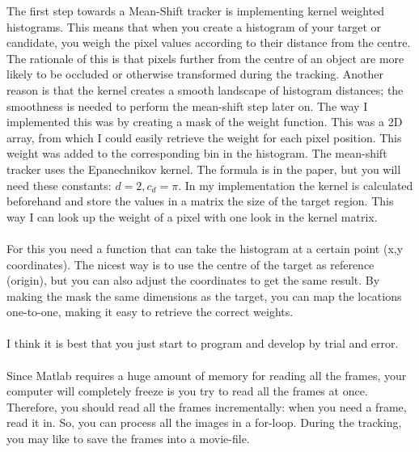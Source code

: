\documentclass[a4paper,11pt]{article}
\begin{document}
		The first step towards a Mean-Shift tracker is implementing kernel
		weighted histograms. This means that when you create a histogram of
		your target or candidate, you weigh the pixel values according to
		their distance from the centre. The rationale of this is that
		pixels further from the centre of an object are more likely to
		be occluded or otherwise transformed during the tracking. Another
		reason is that the kernel creates a smooth landscape of histogram
		distances; the smoothness is needed to perform the mean-shift step
		later on. The way I implemented this was by creating a mask of the
		weight function. This was a 2D array, from which I could easily
		retrieve the weight for each pixel position. This weight was added
		to the corresponding bin in the histogram. The mean-shift tracker
		uses the Epanechnikov kernel. The formula is in the paper, but you
		will need these constants: $d = 2, c_d = \pi$. In my implementation
		the kernel is calculated beforehand and store the values in a matrix
		the size of the target region. This way I can look up the weight of
		a pixel with one look in the kernel matrix.
		\\ \\
		For this you need a function that can take the histogram at a certain
		point (x,y coordinates). The nicest way is to use the centre of the
		target as reference (origin), but you can also adjust the coordinates
		to get the same result. By making the mask the same dimensions as the
		target, you can map the locations one-to-one, making it easy to retrieve
		the correct weights.
		\\ \\
		I think it is best that you just start to program and develop by trial
		and error.
		\\ \\
		Since Matlab requires a huge amount of memory for reading all the frames,
		your computer will completely freeze is you try to read all the frames at
		once. Therefore, you should read all the frames incrementally: when you
		need a frame, read it in. So, you can process all the images in a for-loop.
		During the tracking, you may like to save the frames into a movie-file.
\end{document}
